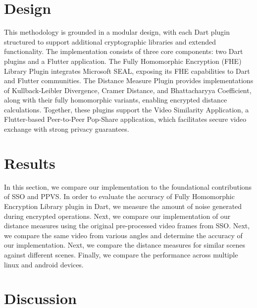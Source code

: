 \documentclass [11pt, proquest] {uwthesis}[2020/02/24]
\begin{document}
 
\chapter{Design}

This methodology is grounded in a modular design, with each Dart plugin structured to support additional cryptographic libraries and extended functionality. The implementation consists of three core components: two Dart plugins and a Flutter application. The Fully Homomorphic Encryption (FHE) Library Plugin integrates Microsoft SEAL, exposing its FHE capabilities to Dart and Flutter communities. The Distance Measure Plugin provides implementations of Kullback-Leibler Divergence, Cramer Distance, and Bhattacharyya Coefficient, along with their fully homomorphic variants, enabling encrypted distance calculations. Together, these plugins support the Video Similarity Application, a Flutter-based Peer-to-Peer Pop-Share application, which facilitates secure video exchange with strong privacy guarantees.






\chapter{Results}

In this section, we compare our implementation to the foundational contributions of SSO and PPVS. In order to evaluate the accuracy of Fully Homomorphic Encryption Library plugin in Dart, we measure the amount of noise generated during encrypted operations. Next, we compare our implementation of our distance measures using the original pre-processed video frames from SSO. Next, we compare the same video from various angles and determine the accuracy of our implementation. Next, we compare the distance measures for similar scenes against different scenes. Finally, we compare the performance across multiple linux and android devices.








\chapter{Discussion}
\end{document}
